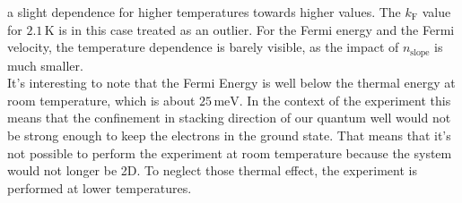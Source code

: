 a slight dependence for higher temperatures towards higher values. The $k_\text{F}$ value for $2.1\,\text{K}$ is in this case
treated as an outlier. For the Fermi energy and the Fermi velocity, the temperature dependence is barely visible, as 
the impact of $n_\text{slope}$ is much smaller. \\
It's interesting to note that the Fermi Energy is well below the thermal energy at room temperature,
which is about $25\,\text{meV}$. In the context of the experiment this means that the confinement in stacking direction
of our quantum well would not be strong enough to keep the electrons in the ground state. That means that it's
not possible to perform the experiment at room temperature because the system would not longer be 2D.
To neglect those thermal effect, the experiment is performed at lower temperatures.